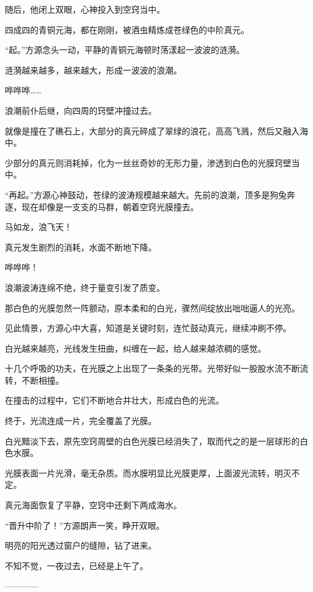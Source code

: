 \begin{this_body}
随后，他闭上双眼，心神投入到空窍当中。

四成四的青铜元海，都在刚刚，被酒虫精炼成苍绿色的中阶真元。

“起。”方源念头一动，平静的青铜元海顿时荡漾起一波波的涟漪。

涟漪越来越多，越来越大，形成一波波的浪潮。

哗哗哗……

浪潮前仆后继，向四周的窍壁冲撞过去。

就像是撞在了礁石上，大部分的真元碎成了翠绿的浪花，高高飞溅，然后又融入海中。

少部分的真元则消耗掉，化为一丝丝奇妙的无形力量，渗透到白色的光膜窍壁当中。

“再起。”方源心神鼓动，苍绿的波涛规模越来越大。先前的浪潮，顶多是狗兔奔逐，现在却像是一支支的马群，朝着空窍光膜撞去。

马如龙，浪飞天！

真元发生剧烈的消耗，水面不断地下降。

哗哗哗！

浪潮波涛连绵不绝，终于量变引发了质变。

那白色的光膜忽然一阵颤动，原本柔和的白光，骤然间绽放出咄咄逼人的光亮。

见此情景，方源心中大喜，知道是关键时刻，连忙鼓动真元，继续冲刷不停。

白光越来越亮，光线发生扭曲，纠缠在一起，给人越来越浓稠的感觉。

十几个呼吸的功夫，在光膜之上出现了一条条的光带。光带好似一股股水流不断流转，不断相撞。

在撞击的过程中，它们不断地合并壮大，形成白色的光流。

终于，光流连成一片，完全覆盖了光膜。

白光黯淡下去，原先空窍周壁的白色光膜已经消失了，取而代之的是一层球形的白色水膜。

光膜表面一片光滑，毫无杂质。而水膜明显比光膜更厚，上面波光流转，明灭不定。

真元海面恢复了平静，空窍中还剩下两成海水。

“晋升中阶了！”方源朗声一笑，睁开双眼。

明亮的阳光透过窗户的缝隙，钻了进来。

不知不觉，一夜过去，已经是上午了。

------------

\end{this_body}

